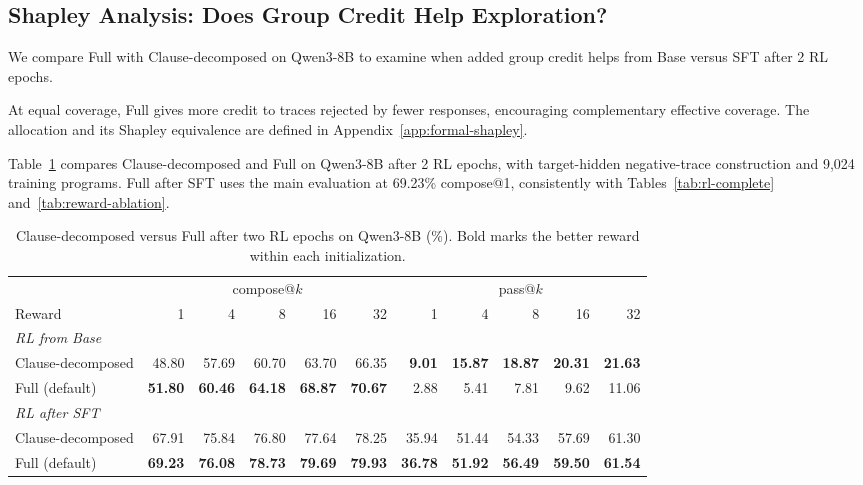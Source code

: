\subsection{Shapley Analysis: Does Group Credit Help Exploration?}
\label{app:full-credit-analysis}

We compare Full with Clause-decomposed on Qwen3-8B to examine when added
group credit helps from Base versus SFT after 2 RL epochs.

At equal coverage, Full gives more credit to traces rejected by fewer
responses, encouraging complementary effective coverage.  The allocation
and its Shapley equivalence are defined in Appendix~\ref{app:formal-shapley}.

Table~\ref{tab:full-credit-comparison} compares Clause-decomposed and Full on
Qwen3-8B after 2 RL epochs, with target-hidden negative-trace construction and 9,024
training programs. Full after SFT uses the main evaluation at 69.23\%
compose@1, consistently with Tables~\ref{tab:rl-complete}
and~\ref{tab:reward-ablation}.

\begin{table}[H]
\centering
\small
\caption{Clause-decomposed versus Full after two RL epochs on Qwen3-8B (\%). Bold marks the better reward within each initialization.}
\label{tab:full-credit-comparison}
\begin{tabular}{lrrrrrrrrrr}
\toprule
\rowcolor{algobg}
& \multicolumn{5}{c}{compose@\(k\)} & \multicolumn{5}{c}{pass@\(k\)} \\
\headercmidrules{\cmidrule(lr){2-6}\cmidrule(lr){7-11}}
\rowcolor{algobg}
Reward & 1 & 4 & 8 & 16 & 32& 1 & 4 & 8 & 16 & 32 \\
\midrule
\multicolumn{11}{l}{\textit{RL from Base}} \\
Clause-decomposed & 48.80 & 57.69 & 60.70 & 63.70 & 66.35& \textbf{9.01} & \textbf{15.87} & \textbf{18.87} & \textbf{20.31} & \textbf{21.63} \\
Full (default) & \textbf{51.80} & \textbf{60.46} & \textbf{64.18} & \textbf{68.87} & \textbf{70.67}& 2.88 & 5.41 & 7.81 & 9.62 & 11.06 \\
\midrule
\multicolumn{11}{l}{\textit{RL after SFT}} \\
Clause-decomposed & 67.91 & 75.84 & 76.80 & 77.64 & 78.25& 35.94 & 51.44 & 54.33 & 57.69 & 61.30 \\
Full (default) & \textbf{69.23} & \textbf{76.08} & \textbf{78.73} & \textbf{79.69} & \textbf{79.93}& \textbf{36.78} & \textbf{51.92} & \textbf{56.49} & \textbf{59.50} & \textbf{61.54} \\
\bottomrule
\end{tabular}
\end{table}

